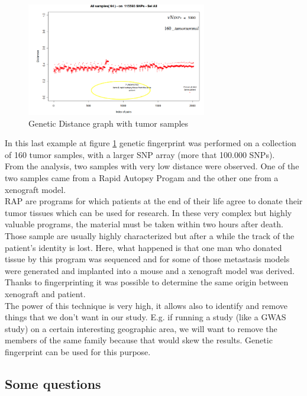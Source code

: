 \begin{figure}[H]
	\centering
	\includegraphics[width=0.7\textwidth]{loci3.PNG}
	\caption{Genetic Distance graph with tumor samples}
	\label{fig:Distance3}
\end{figure}


In this last example at figure \ref{fig:Distance3} genetic fingerprint was performed on a collection of 160  tumor samples, with a larger SNP array (more that 100.000 SNPs).
\\
From the analysis, two samples with very low distance were observed. One of the two samples came from a Rapid Autopsy Progam and the other one from a xenograft model.
\\
RAP are programs for which patients at the end of their life agree to donate their tumor tissues which can be used for research. In these very complex but highly valuable programs, the material must be taken within two hours after death. Those sample are usually highly characterized but after a while the track of the patient's identity is lost.
Here, what happened is that one man who donated tissue by this program was sequenced and for some of those metastasis models were generated and implanted into a mouse and a xenograft model was derived. Thanks to fingerprinting it was possible to determine the same origin between xenograft and patient.
\\
The power of this technique is very high, it allows also to identify and remove things that we don't want in our study. E.g. if running a study (like a GWAS study) on a certain interesting geographic area, we will want to remove the members of the same family because that would skew the results. Genetic fingerprint can be used for this purpose.

\subsection{Some questions}

